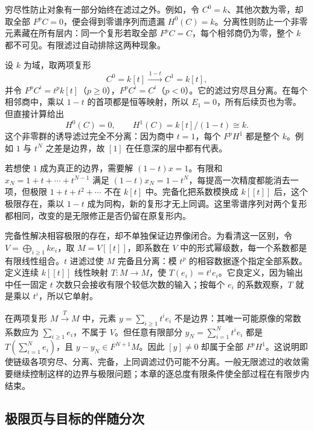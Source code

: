 \ProseParagraphBreak

穷尽性防止对象有一部分始终在滤过之外。例如，令 \(C^0=k\)、其他次数为零，却取全部 \(F^pC=0\)，便会得到零谱序列而遗漏 \(H^0(C)=k\)。分离性则防止一个非零元素藏在所有层内：同一个复形若取全部 \(F^pC=C\)，每个相邻商仍为零，整个 \(k\) 都不可见。有限滤过自动排除这两种现象。

\begin{example}\label{g2:exm:incomplete-filtered-complex}
	设 \(k\) 为域，取两项复形
	\[
		C^0=k[t]\xrightarrow{\,1-t\,}C^1=k[t],
	\]
	并令 \(F^pC^i=t^pk[t]\)（\(p\ge0\)），\(F^pC^i=C^i\)（\(p<0\)）。它的滤过穷尽且分离。在每个相邻商中，乘以 \(1-t\) 的首项都是恒等映射，所以 \(E_1=0\)，所有后续页也为零。但直接计算给出
	\[
		H^0(C)=0,\qquad H^1(C)=k[t]/(1-t)\cong k.
	\]
	这个非零群的诱导滤过完全不分离：因为商中 \(t=1\)，每个 \(F^pH^1\) 都是整个 \(k\)。例如 \(1\) 与 \(t^N\) 之差是边界，故 \([1]\) 在任意深的层中都有代表。

	若想使 \(1\) 成为真正的边界，需要解 \((1-t)x=1\)。有限和 \(x_N=1+t+\cdots+t^{N-1}\) 满足 \((1-t)x_N=1-t^N\)，每提高一次精度都能消去一项，但极限 \(1+t+t^2+\cdots\) 不在 \(k[t]\) 中。完备化把系数模换成 \(k[[t]]\) 后，这个极限存在，乘以 \(1-t\) 成为同构，新的复形才无上同调。这里零谱序列对两个复形都相同，改变的是无限修正是否仍留在原复形内。
\end{example}

完备性解决相容极限的存在，却不单独保证边界像闭合。为看清这一区别，令 \(V=\bigoplus_{i\ge1}ke_i\)，取 \(M=V[[t]]\)，即系数在 \(V\) 中的形式幂级数，每一个系数都是有限线性组合。\(t\) 进滤过使 \(M\) 完备且分离：模 \(t^p\) 的相容数据逐个指定全部系数。定义连续 \(k[[t]]\) 线性映射 \(T:M\to M\)，使 \(T(e_i)=t^ie_i\)。它良定义，因为输出中任一固定 \(t\) 次数只会接收有限个较低次数的输入；按每个 \(e_i\) 的系数观察，\(T\) 就是乘以 \(t^i\)，所以它单射。

\ProseParagraphBreak

在两项复形 \(M\xrightarrow{T}M\) 中，元素 \(y=\sum_{i\ge1}t^ie_i\) 不是边界：其唯一可能原像的常数系数应为 \(\sum_{i\ge1}e_i\)，不属于 \(V\)。但任意有限部分 \(y_N=\sum_{i=1}^Nt^ie_i\) 都是 \(T(\sum_{i=1}^Ne_i)\)，且 \(y-y_N\in F^{N+1}M\)。因此 \([y]\ne0\) 却属于全部 \(F^pH^1\)。这说明即使链级各项穷尽、分离、完备，上同调滤过仍可能不分离。一般无限滤过的收敛需要继续控制这样的边界与极限问题；本章的逐总度有限条件使全部过程在有限步内结束。

\subsection{极限页与目标的伴随分次}
\label{g2:subsec:1004:03}

